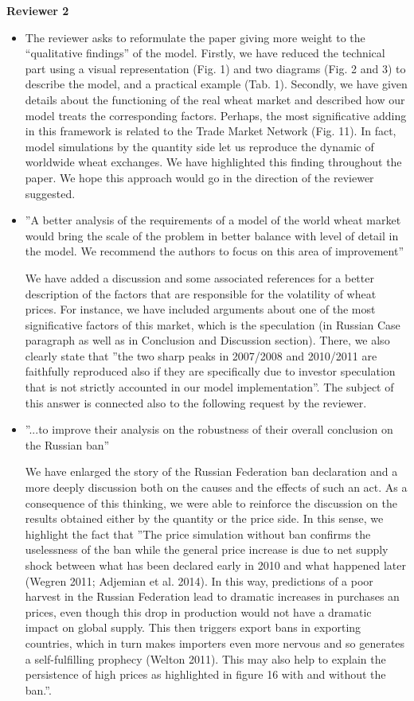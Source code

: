 \documentclass[a4paper,12pt]{article}
\begin{document}
\vskip1cm
\textbf{Reviewer 2}
\begin{itemize}
	\item The reviewer asks to reformulate the paper giving more weight to the ``qualitative findings'' of the model.
    Firstly, we have reduced the technical part using a visual representation (Fig. 1) and two diagrams (Fig. 2 and 3) to describe the model, and a practical example (Tab. 1). Secondly, we have given details about the functioning of the real wheat market and described how our model treats the corresponding factors. Perhaps, the most significative adding in this framework is related to the Trade Market Network (Fig. 11). In fact, model simulations by the quantity side let us reproduce the dynamic of worldwide wheat exchanges. We have highlighted this finding throughout the paper. We hope this approach would go in the direction of the reviewer suggested.
    
    \item ''A better analysis of the requirements of a model of the world wheat market would bring the scale of the problem in better balance with level of detail in the model. We recommend the authors to focus on this area of improvement'' 
    
    We have added a discussion and some associated references for a better description of the factors that are responsible for the volatility of wheat prices. For instance, we have included arguments about one of the most significative factors of this market, which is the speculation (in Russian Case paragraph as well as in Conclusion and Discussion section). There, we also clearly state that ''the two sharp peaks in 2007/2008 and 2010/2011 are faithfully reproduced also if they are specifically due to investor speculation that is not strictly accounted in our model implementation''. The subject of this answer is connected also to the following request by the reviewer.
    
    \item ''...to improve their analysis on the robustness of their overall conclusion on the Russian ban''
    
    We have enlarged the story of the Russian Federation ban declaration and a more deeply discussion both on the causes and the effects of such an act. As a consequence of this thinking, we were able to reinforce the discussion on the results obtained either by the quantity or the price side. In this sense, we highlight the fact that  ''The price simulation without ban confirms the uselessness of the ban while the general price increase is due to net supply shock between what has been declared early in 2010 and what happened later (Wegren 2011; Adjemian et al. 2014). In this way, predictions of a poor harvest in the Russian Federation lead to dramatic increases in purchases an prices, even though this drop in production would not have a dramatic impact on global supply. This then triggers export bans in exporting countries, which in turn makes importers even more nervous and so generates a self-fulfilling prophecy (Welton 2011). This may also help to explain the persistence of high prices as highlighted in figure 16 with and without the ban.''. 

	
\end{itemize}
\end{document}
